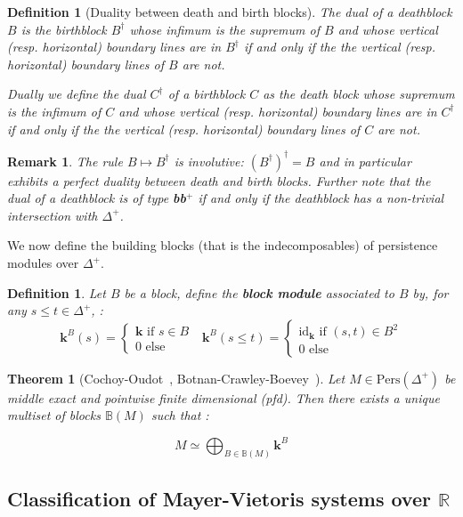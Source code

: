\documentclass[a4paper, english, 11pt]{article}
\newcommand{\kk}[0]{\textbf{k}}
\newcommand{\0}{\vec{0}}
\newcommand{\R}[0]{\mathbb{R}}
\newcommand{\Pers}[0]{\text{Pers}}
\newtheorem{remark}[prop]{Remark}
\newtheorem{defi}[prop]{Definition}
\newtheorem{thm}[prop]{Theorem}
\begin{document}
\begin{defi}[Duality between death and birth blocks]
 \label{D:dualblocks} The dual  of a deathblock $B$ is the birthblock $B^\dagger$ whose infimum is the supremum of $B$ and whose vertical (resp. horizontal) boundary lines are in $B^\dagger$ if and only if the the vertical (resp. horizontal) boundary lines of $B$ are not. 
 
 Dually we define the dual $C^\dagger$ of a birthblock $C$ as the death block whose supremum is the infimum of $C$ and whose vertical (resp. horizontal) boundary lines are in $C^\dagger$ if and only if the the vertical (resp. horizontal) boundary lines of $C$ are not.
\end{defi}
\begin{remark}
 The rule $B\mapsto B^\dagger$ is involutive: $(B^\dagger)^\dagger=B$ and in particular exhibits a perfect duality between death and birth blocks.  Further note that the dual of a deathblock is of type \textbf{bb}$^{+}$ if and only if the deathblock has a non-trivial intersection with $\Delta^+$. 
\end{remark}


We now define the building blocks (that is the indecomposables) of persistence modules over $\Delta^+$.
\begin{defi}\label{Def:blockmodule}
Let $B$ be a block, define the \textbf{block module} associated to $B$ by, for any $s\leq t \in \Delta^+$, : 
$$\kk^B(s) = \begin{cases} \kk \text{~if~}s\in B \\ 0 \text{~else}
\end{cases} ~~~\kk^B(s\leq t) = \begin{cases} \text{id}_\kk \text{~if~} (s,t)\in B^2 \\ 0 \text{~else} \end{cases} $$
\end{defi}

\begin{thm}[Cochoy-Oudot~\cite{CO17}, Botnan-Crawley-Boevey~\cite{BotCra18}] \label{thm:exactdecomp}
Let $M\in \Pers(\Delta^+)$ be middle exact and pointwise finite dimensional (pfd). Then there exists a unique multiset of blocks $\mathbb{B}(M)$ such that : 

$$M \simeq \bigoplus_{B\in \mathbb{B}(M)} \kk^B $$
\end{thm}




\subsection{Classification of Mayer-Vietoris systems over $\R$}\label{S:ClassMVSystems}
\end{document}

